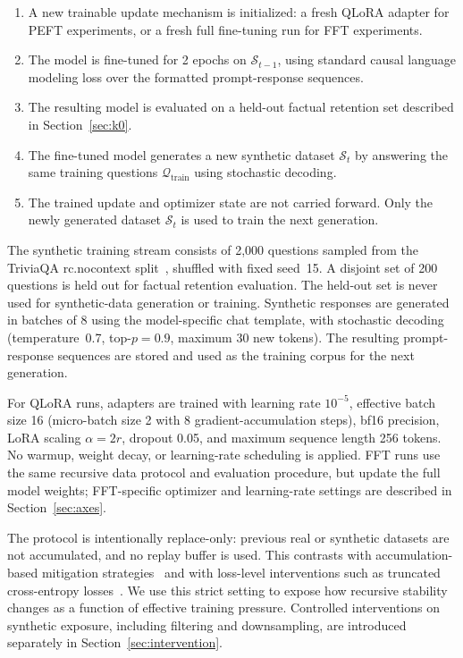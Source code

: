 \documentclass[a4paper,fleqn]{cas-dc}
\begin{document}
\begin{enumerate}
    \item A new trainable update mechanism is initialized: a fresh QLoRA adapter
    for PEFT experiments, or a fresh full fine-tuning run for FFT experiments.
    \item The model is fine-tuned for 2 epochs on $\mathcal{S}_{t-1}$, using
    standard causal language modeling loss over the formatted prompt-response
    sequences.
    \item The resulting model is evaluated on a held-out factual retention set
    described in Section~\ref{sec:k0}.
    \item The fine-tuned model generates a new synthetic dataset
    $\mathcal{S}_t$ by answering the same training questions
    $\mathcal{Q}_{\mathrm{train}}$ using stochastic decoding.
    \item The trained update and optimizer state are not carried forward. Only
    the newly generated dataset $\mathcal{S}_t$ is used to train the next
    generation.
\end{enumerate}

The synthetic training stream consists of 2{,}000
questions sampled from the TriviaQA rc.nocontext split~\citep{joshi2017},
shuffled with fixed seed~15. A disjoint set of 200 questions is held out for
factual retention evaluation. The held-out set is never used for synthetic-data
generation or training. Synthetic responses are generated in batches of 8 using
the model-specific chat template, with stochastic decoding
(temperature~0.7, top-$p=0.9$, maximum 30 new tokens). The resulting
prompt-response sequences are stored and used as the training corpus for the
next generation.

For QLoRA runs, adapters are trained with learning rate $10^{-5}$, effective
batch size 16 (micro-batch size 2 with 8 gradient-accumulation steps), bf16
precision, LoRA scaling $\alpha=2r$, dropout 0.05, and maximum sequence length
256 tokens. No warmup, weight decay, or learning-rate
scheduling is applied. FFT runs use the same recursive data protocol and
evaluation procedure, but update the full model weights; FFT-specific optimizer
and learning-rate settings are described in Section~\ref{sec:axes}.

The protocol is intentionally replace-only: previous real or synthetic datasets
are not accumulated, and no replay buffer is used. This contrasts with
accumulation-based mitigation strategies~\citep{gerstgrasser2024} and with
loss-level interventions such as truncated cross-entropy
losses~\citep{zibakhsh2024}. We use this strict setting to expose how recursive
stability changes as a function of effective training pressure. Controlled
interventions on synthetic exposure, including filtering and downsampling, are
introduced separately in Section~\ref{sec:intervention}.
\end{document}
